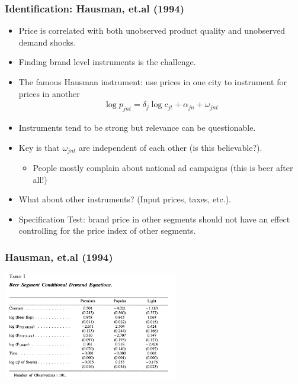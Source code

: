 \documentclass[xcolor=pdftex,dvipsnames,table,mathserif,aspectratio=169]{beamer}
\begin{document}
\begin{frame}
\frametitle{Identification: Hausman, et.al (1994)}
\small
\begin{itemize}
\item Price is correlated with both \alert{unobserved product quality} and \alert{unobserved demand shocks}.
\item Finding brand level instruments is the challenge.
\item The famous \alert{Hausman instrument}: use prices in one city to instrument for prices in another
\begin{eqnarray*}
\log p_{jnt} = \delta_j \log c_{jt} + \alpha_{jn} + \omega_{jnt}
\end{eqnarray*}
\item Instruments tend to be \alert{strong} but \alert{relevance} can be questionable.
\item Key is that $\omega_{jnt}$ are independent of each other (is this believable?).
\begin{itemize}
\item People mostly complain about national ad campaigns (this is beer after all!)
\end{itemize}
\item What about other instruments? (Input prices, taxes, etc.).
\item Specification Test: brand price in other segments should not have an effect controlling for the price index of other segments.
\end{itemize}
\end{frame} 


\begin{frame}
\frametitle{Hausman, et.al (1994)}
\begin{center}
\includegraphics[width=3in]{resources/beer1.png}
\end{center}
\end{frame} 
\end{document}
